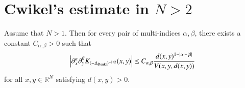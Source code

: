 \documentclass[12pt]{amsart}
\begin{document}
%

\section{Cwikel's estimate in $N>2$}

\begin{lemma}\label{lem:Dunkl-fractional-kernel-derivative}
Assume that $N>1$. Then for every pair of multi-indices $\alpha,\beta$, there exists
a constant $C_{\alpha,\beta}>0$ such that
\begin{equation}\label{eq:localized-K-derivative}
\left|
\partial_x^\alpha\partial_y^\beta
K_{(-\Delta_{{\rm Dunkl}})^{-1/2}}(x,y)
\right|
\leq
C_{\alpha,\beta}
\frac{
d(x,y)^{1-|\alpha|-|\beta|}
}{
V(x,y,d(x,y))
}
\end{equation}
for all $x,y\in\mathbb R^N$ satisfying $d(x,y)>0$.
\end{lemma}
\end{document}
